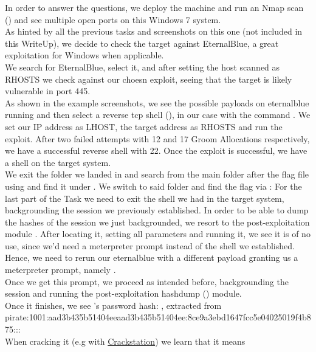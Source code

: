{In order to answer the questions, we deploy the machine and run an Nmap scan () and see multiple open ports on this Windows 7 system.\\
As hinted by all the previous tasks and screenshots on this one (not included in this WriteUp), we decide to check the target against EternalBlue, a great exploitation for Windows when applicable.\\
We search for EternalBlue, select it, and after setting the host scanned as RHOSTS we check against our choesn exploit, seeing that the target is likely vulnerable in port 445.\\
As shown in the example screenshots, we see the possible payloads on eternalblue running  and then select a reverse tcp shell (), in our case with the command . We set our IP address as LHOST, the target address as RHOSTS and run the exploit. After two failed attempts with 12 and 17 Groom Allocations respectively, we have a successful reverse shell with 22. Once the exploit is successful, we have a shell on the target system.\\
We exit the  folder we landed in and search from the main  folder after the flag file using  and find it under . We switch to said folder and find the flag via :
For the last part of the Task we need to exit the shell we had in the target system, backgrounding the session we previously established. In order to be able to dump the hashes of the session we just backgrounded, we resort to the post-exploitation module . After locating it, setting all parameters and running it, we see it is of no use, since we'd need a meterpreter prompt instead of the shell we established.\\
Hence, we need to rerun our eternalblue with a different payload granting us a meterpreter prompt, namely .\\
Once we get this prompt, we proceed as intended before, backgrounding the session and running the post-exploitation hashdump () module.\\
Once it finishes, we see 's password hash: , extracted from \\
pirate:1001:aad3b435b51404eeaad3b435b51404ee:8ce9a3ebd1647fcc5e04025019f4b875:::\\
When cracking it (e.g with \href{https://crackstation.net}{Crackstation}) we learn that it means 
}
